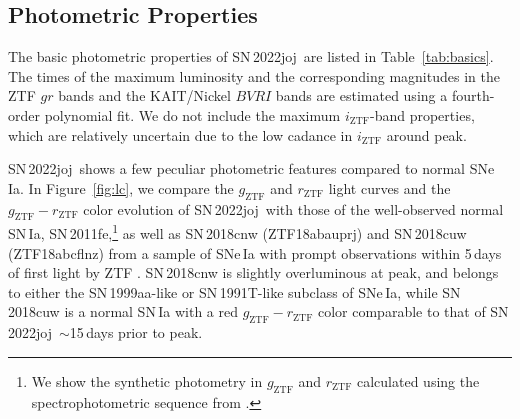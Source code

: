 \documentclass[twocolumn]{aastex631}
\newcommand{\sn}{SN\,2022joj}
\begin{document}
\begin{CJK*}{UTF8}{gbsn}
\subsection{Photometric Properties} \label{sec:analysis_phot}
The basic photometric properties of \sn\ are listed in Table~\ref{tab:basics}. The times of the maximum luminosity and the corresponding magnitudes in the ZTF $gr$ bands and the KAIT/Nickel $BVRI$ bands are estimated using a fourth-order polynomial fit. We do not include the maximum $i_\mathrm{ZTF}$-band properties, which are relatively uncertain due to the low cadance in $i_\mathrm{ZTF}$ around peak. 

\sn\ shows a few peculiar photometric features compared to normal SNe\,Ia. In Figure~\ref{fig:lc}, we compare the $g_\mathrm{ZTF}$ and $r_\mathrm{ZTF}$ light curves and the $g_\mathrm{ZTF} - r_\mathrm{ZTF}$ color evolution of \sn\ with those of the well-observed normal SN\,Ia, SN\,2011fe,\footnote{We show the synthetic photometry in $g_\mathrm{ZTF}$ and $r_\mathrm{ZTF}$ calculated using the spectrophotometric sequence from \citet{Pereira_2013}.} as well as SN\,2018cnw (ZTF18abauprj) and SN\,2018cuw (ZTF18abcflnz) from a sample of SNe\,Ia with prompt observations within 5\,days of first light by ZTF \citep{Yao_2019,Bulla2020}. 
SN\,2018cnw is slightly overluminous at peak, and belongs to either the SN\,1999aa-like \citep[99aa-like;][]{Garavini_99aa_2004} or SN\,1991T-like \citep[91T-like;][]{Filippenko_91T_1992} subclass of SNe\,Ia, while SN\,2018cuw is a normal SN\,Ia with a red $g_\mathrm{ZTF} - r_\mathrm{ZTF}$ color comparable to that of \sn\ $\sim$15\,days prior to peak. 


\end{CJK*}
\end{document}

